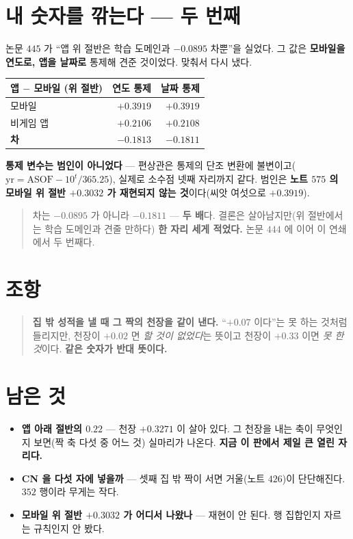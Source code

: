 \documentclass[11pt]{article}
\begin{document}
\section*{내 숫자를 깎는다 --- 두 번째}

논문 $445$ 가 ``앱 위 절반은 학습 도메인과 $-0.0895$ 차뿐''을 실었다.
그 값은 \textbf{모바일을 연도로, 앱을 날짜로} 통제해 견준 것이었다.
맞춰서 다시 냈다.

\begin{center}
\begin{tabular}{lrr}
\hline
앱 $-$ 모바일 (위 절반) & 연도 통제 & 날짜 통제 \\
\hline
모바일 & $+0.3919$ & $+0.3919$ \\
비게임 앱 & $+0.2106$ & $+0.2108$ \\
\textbf{차} & $\mathbf{-0.1813}$ & $\mathbf{-0.1811}$ \\
\hline
\end{tabular}
\end{center}

\textbf{통제 변수는 범인이 아니었다} --- 편상관은 통제의 단조 변환에
불변이고($\mathrm{yr} = \mathrm{ASOF} - 10^{t}/365.25$), 실제로 소수점
넷째 자리까지 같다. 범인은 \textbf{노트 $575$ 의 모바일 위 절반
$+0.3032$ 가 재현되지 않는 것}이다(씨앗 여섯으로 $+0.3919$).

\begin{quote}
차는 $-0.0895$ 가 아니라 $\mathbf{-0.1811}$ --- \textbf{두 배}다.
결론은 살아남지만(위 절반에서는 학습 도메인과 견줄 만하다) \textbf{한
자리 세게 적었다.} 논문 $444$ 에 이어 이 연쇄에서 두 번째다.
\end{quote}

\section*{조항}

\begin{quote}
\textbf{집 밖 성적을 낼 때 그 짝의 천장을 같이 낸다.} ``$+0.07$ 이다''는
못 하는 것처럼 들리지만, 천장이 $+0.02$ 면 \emph{할 것이 없었다}는
뜻이고 천장이 $+0.33$ 이면 \emph{못 한 것}이다. \textbf{같은 숫자가 반대
뜻이다.}
\end{quote}

\section*{남은 것}

\begin{itemize}
\item \textbf{앱 아래 절반의 $0.22$} --- 천장 $+0.3271$ 이 살아 있다.
그 천장을 내는 축이 무엇인지 보면(짝 축 다섯 중 어느 것) 실마리가 나온다.
\textbf{지금 이 판에서 제일 큰 열린 자리다.}
\item \textbf{CN 을 다섯 자에 넣을까} --- 셋째 집 밖 짝이 서면 거울(노트
$426$)이 단단해진다. $352$ 행이라 무게는 작다.
\item \textbf{모바일 위 절반 $+0.3032$ 가 어디서 나왔나} --- 재현이 안 된다.
행 집합인지 자르는 규칙인지 안 봤다.
\end{itemize}
\end{document}
